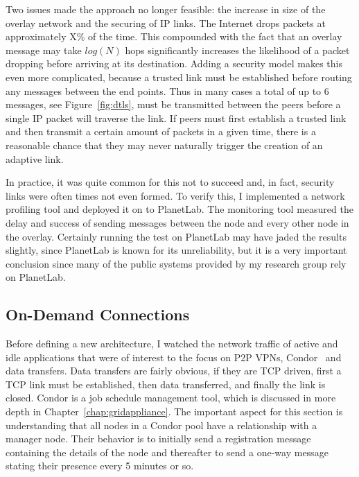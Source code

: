 Two issues made the approach no longer feasible:  the increase in size of the
overlay network and the securing of IP links.  The Internet drops packets at
approximately X\% of the time.  This compounded with the fact that an overlay
message may take $log(N)$ hops significantly increases the likelihood of a
packet dropping before arriving at its destination.  Adding a security model
makes this even more complicated, because a trusted link must be established
before routing any messages between the end points.  Thus in many cases a total
of up to 6 messages, see Figure~\ref{fig:dtls}, must be transmitted between the
peers before a single IP packet will traverse the link.  If peers must first
establish a trusted link and then transmit a certain amount of packets in a
given time, there is a reasonable chance that they may never naturally trigger
the creation of an adaptive link.

In practice, it was quite common for this not to succeed and, in fact, security
links were often times not even formed.  To verify this, I implemented a
network profiling tool and deployed it on to PlanetLab.  The monitoring tool
measured the delay and success of sending messages between the node and every
other node in the overlay.  Certainly running the test on PlanetLab may have
jaded the results slightly, since PlanetLab is known for its unreliability, but
it is a very important conclusion since many of the public systems provided by
my research group rely on PlanetLab.

\subsection{On-Demand Connections}

Before defining a new architecture, I watched the network traffic of active and
idle applications that were of interest to the focus on P2P VPNs,
Condor~\cite{condor0} and data transfers.  Data transfers are fairly obvious,
if they are TCP driven, first a TCP link must be established, then data
transferred, and finally the link is closed.  Condor is a job schedule
management tool, which is discussed in more depth in
Chapter~\ref{chap:gridappliance}.  The important aspect for this section is
understanding that all nodes in a Condor pool have a relationship with a
manager node.  Their behavior is to initially send a registration message
containing the details of the node and thereafter to send a one-way message
stating their presence every 5 minutes or so.

